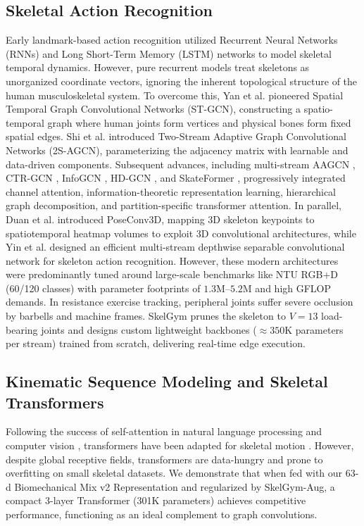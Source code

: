 \documentclass[preprint,12pt]{elsarticle}
\begin{document}
\subsection{Skeletal Action Recognition}
Early landmark-based action recognition utilized Recurrent Neural Networks (RNNs) and Long Short-Term Memory (LSTM) networks \cite{hochreiter1997long,graves2005,li2017} to model skeletal temporal dynamics. 
However, pure recurrent models treat skeletons as unorganized coordinate vectors, ignoring the inherent topological structure of the human musculoskeletal system.
To overcome this, Yan et al. \cite{yan2018} pioneered Spatial Temporal Graph Convolutional Networks (ST-GCN), constructing a spatio-temporal graph where human joints form vertices and physical bones form fixed spatial edges. 
Shi et al. \cite{shi2019two} introduced Two-Stream Adaptive Graph Convolutional Networks (2S-AGCN), parameterizing the adjacency matrix with learnable and data-driven components. 
Subsequent advances, including multi-stream AAGCN \cite{shi2020skeleton}, CTR-GCN \cite{chen2021channel}, InfoGCN \cite{chi2022infogcn}, HD-GCN \cite{lee2023hdgcn}, and SkateFormer \cite{zheng2024skateformer}, progressively integrated channel attention, information-theoretic representation learning, hierarchical graph decomposition, and partition-specific transformer attention. 
In parallel, Duan et al. \cite{duan2022} introduced PoseConv3D, mapping 3D skeleton keypoints to spatiotemporal heatmap volumes to exploit 3D convolutional architectures, while Yin et al. \cite{yin2023} designed an efficient multi-stream depthwise separable convolutional network for skeleton action recognition. 
However, these modern architectures were predominantly tuned around large-scale benchmarks like NTU RGB+D (60/120 classes) with parameter footprints of $1.3\text{M}$--$5.2\text{M}$ and high GFLOP demands. 
In resistance exercise tracking, peripheral joints suffer severe occlusion by barbells and machine frames. 
SkelGym prunes the skeleton to $V=13$ load-bearing joints and designs custom lightweight backbones ($\approx 350\text{K}$ parameters per stream) trained from scratch, delivering real-time edge execution.

\subsection{Kinematic Sequence Modeling and Skeletal Transformers}
Following the success of self-attention in natural language processing and computer vision \cite{vaswani2017,arnab2021,bertasius2021,liu2022video}, transformers have been adapted for skeletal motion \cite{plizzari2021sttr}. 
However, despite global receptive fields, transformers are data-hungry and prone to overfitting on small skeletal datasets. 
We demonstrate that when fed with our 63-d Biomechanical Mix v2 Representation and regularized by SkelGym-Aug, a compact 3-layer Transformer (301K parameters) achieves competitive performance, functioning as an ideal complement to graph convolutions.
\end{document}
